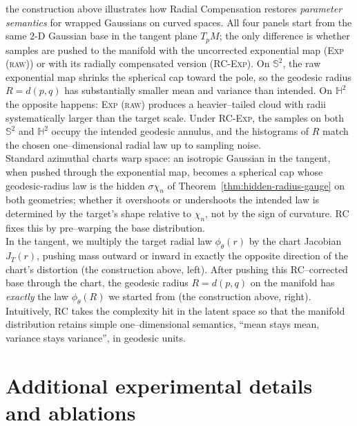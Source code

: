 \documentclass{article}
\theoremstyle{definition}
\theoremstyle{remark}
\newcommand{\SSS}{\mathbb{S}}
\newcommand{\HH}{\mathbb{H}}
\begin{document}
the construction above illustrates how Radial Compensation restores
\emph{parameter semantics} for wrapped Gaussians on curved spaces.
All four panels start from the same $2$-D Gaussian base in the tangent
plane $T_pM$; the only difference is whether samples are pushed to the
manifold with the uncorrected exponential map (\textsc{Exp (raw)}) or
with its radially compensated version (\textsc{RC-Exp}).
On $\SSS^2$, the raw exponential map shrinks the spherical cap toward the
pole, so the geodesic radius $R=d(p,q)$ has substantially smaller mean
and variance than intended.
On $\HH^2$ the opposite happens: \textsc{Exp (raw)} produces a
heavier–tailed cloud with radii systematically larger than the target
scale.
Under \textsc{RC-Exp}, the samples on both $\SSS^2$ and $\HH^2$
occupy the intended geodesic annulus, and the histograms of $R$ match
the chosen one–dimensional radial law up to sampling noise.\\

Standard azimuthal charts warp space: an isotropic Gaussian in the
tangent, when pushed through the exponential map, becomes a spherical cap
whose geodesic-radius law is the hidden $\sigma\chi_n$ of Theorem~\ref{thm:hidden-radius-gauge} on both geometries; whether it overshoots or undershoots the intended law is determined by the target's shape relative to $\chi_n$, not by the sign of curvature.
RC fixes this by pre–warping the base distribution.\\

In the tangent, we multiply the target radial law $\phi_{\theta}(r)$ by
the chart Jacobian $J_{T}(r)$, pushing mass outward or inward in exactly
the opposite direction of the chart's distortion
(the construction above, left).
After pushing this RC–corrected base through the chart, the geodesic
radius $R = d(p,q)$ on the manifold has \emph{exactly} the law
$\phi_{\theta}(R)$ we started from (the construction above, right).\\

Intuitively, RC takes the complexity hit in the latent space so that the
manifold distribution retains simple one–dimensional semantics, ``mean
stays mean, variance stays variance'', in geodesic units.


\section{Additional experimental details and ablations}
\label{app:extra-exp}
\end{document}
